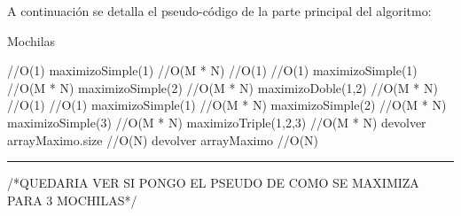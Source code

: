 A continuaci\'on se detalla el pseudo-c\'odigo de la parte principal del algoritmo:

\begin{algorithm}[H]
\caption{Mochilas}
\begin{algorithmic}[1]
 \hfill //O(1)
\state maximizoSimple(1) \hfill //O(M * N)
\endif
{} \hfill //O(1)
 \hfill //O(1)
\state maximizoSimple(1) \hfill //O(M * N)
\state maximizoSimple(2) \hfill //O(M * N)
\Else
\state maximizoDoble(1,2) \hfill //O(M * N)
\endif
\endif
{} \hfill //O(1)
 \hfill //O(1)
\state maximizoSimple(1) \hfill //O(M * N)
\state maximizoSimple(2) \hfill //O(M * N)
\state maximizoSimple(3) \hfill //O(M * N)
\Else
\state maximizoTriple(1,2,3) \hfill //O(M * N)
\endif
\endif
\state devolver arrayMaximo.size \hfill //O(N)
\state devolver arrayMaximo \hfill //O(N)
\EndFunction 
\end{algorithmic}
\hrule
{}
\end{algorithm}

/*QUEDARIA VER SI PONGO EL PSEUDO DE COMO SE MAXIMIZA PARA 3 MOCHILAS*/